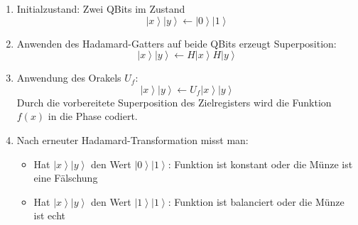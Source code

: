 \begin{enumerate}
    \item Initialzustand: Zwei QBits im Zustand
$$\left|x\right\rangle\left|y\right\rangle \leftarrow  \left|0\right\rangle \left|1\right\rangle$$
\item Anwenden des Hadamard-Gatters auf beide QBits erzeugt Superposition:
$$
\left|x\right\rangle\left|y\right\rangle \leftarrow  H\left|x\right\rangle H\left|y\right\rangle
$$
\item Anwendung des Orakels $U_f$:
 $$
\left|x\right\rangle\left|y\right\rangle \leftarrow  U_f\left|x\right\rangle\left|y\right\rangle
$$
    Durch die vorbereitete Superposition des Zielregisters wird die Funktion $f(x)$ in die Phase codiert.
\item Nach erneuter Hadamard-Transformation misst man:
 \begin{itemize}
     \item Hat $\left|x\right\rangle\left|y\right\rangle$ den Wert $\left|0\right\rangle\left|1\right\rangle$: Funktion ist konstant oder die Münze ist eine Fälschung
     \item Hat $\left|x\right\rangle\left|y\right\rangle$ den Wert $\left|1\right\rangle\left|1\right\rangle$: Funktion ist balanciert oder die Münze ist echt
 \end{itemize}
\end{enumerate}

